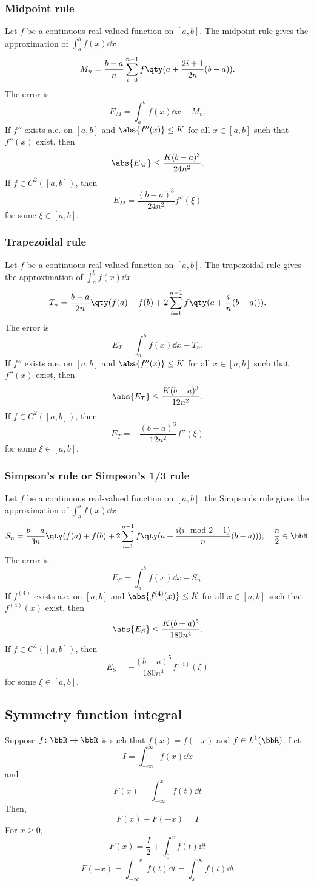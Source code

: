 \documentclass[a4paper,12pt]{report}
\begin{document}
\begin{itemize}
\begin{itemize}
\subsubsection{Midpoint rule}
Let $f$ be a continuous real-valued function on $[a,b]$. The midpoint rule gives the approximation of $\int_a^bf(x)\dd{x}$
\[M_n=\frac{b-a}{n}\sum_{i=0}^{n-1}f\qty(a+\frac{2i+1}{2n}(b-a)).\]
The error is
\[E_M=\int_a^bf(x)\dd{x}-M_n.\]
If $f''$ exists a.e. on $[a,b]$ and $\abs{f''(x)}\leq K$ for all $x\in[a,b]$ such that $f''(x)$ exist, then
\[\abs{E_M}\leq\frac{K(b-a)^3}{24n^2}.\]
If $f\in C^2([a,b])$, then
\[E_M=\frac{(b-a)^3}{24n^2}f''(\xi)\]
for some $\xi\in[a,b]$.
\subsubsection{Trapezoidal rule}
Let $f$ be a continuous real-valued function on $[a,b]$. The trapezoidal rule gives the approximation of $\int_a^bf(x)\dd{x}$
\[T_n=\frac{b-a}{2n}\qty(f(a)+f(b)+2\sum_{i=1}^{n-1}f\qty(a+\frac{i}{n}(b-a))).\]
The error is
\[E_T=\int_a^bf(x)\dd{x}-T_n.\]
If $f''$ exists a.e. on $[a,b]$ and $\abs{f''(x)}\leq K$ for all $x\in[a,b]$ such that $f''(x)$ exist, then
\[\abs{E_T}\leq\frac{K(b-a)^3}{12n^2}.\]
If $f\in C^2([a,b])$, then
\[E_T=-\frac{(b-a)^3}{12n^2}f''(\xi)\]
for some $\xi\in[a,b]$.
\subsubsection{Simpson's rule or Simpson's 1/3 rule}
Let $f$ be a continuous real-valued function on $[a,b]$, the Simpson's rule gives the approximation of $\int_a^bf(x)\dd{x}$
\[S_n=\frac{b-a}{3n}\qty(f(a)+f(b)+2\sum_{i=1}^{n-1}f\qty(a+\frac{i(i\mod 2+1)}{n}(b-a))),\quad\frac{n}{2}\in\bbN.\]
The error is
\[E_S=\int_a^bf(x)\dd{x}-S_n.\]
If $f^{(4)}$ exists a.e. on $[a,b]$ and $\abs{f^{(4)}(x)}\leq K$ for all $x\in[a,b]$ such that $f^{(4)}(x)$ exist, then
\[\abs{E_S}\leq\frac{K(b-a)^5}{180n^4}.\]
If $f\in C^4([a,b])$, then
\[E_S=-\frac{(b-a)^5}{180n^4}f^{(4)}(\xi)\]
for some $\xi\in[a,b]$.
\subsection{Symmetry function integral}
Suppose $f\colon\bbR\to\bbR$ is such that $f(x)=f(-x)$ and $f\in L^1(\bbR)$. Let
\[I=\int_{-\infty}^{\infty}f(x)\dd{x}\]
and
\[F(x)=\int_{-\infty}^xf(t)\dd{t}\]
Then,
\[F(x)+F(-x)=I\]
\bpr
For $x\ge 0$,
\[F(x)=\frac{I}{2}+\int_0^xf(t)\dd{t}\]
\[F(-x)=\int_{-\infty}^{-x}f(t)\dd{t}=\int_x^{\infty}f(t)\dd{t}\]
\epr

\end{itemize}
\end{itemize}
\end{document}

